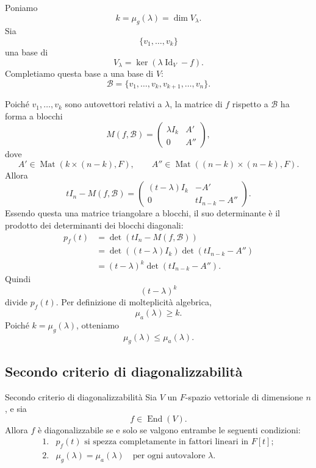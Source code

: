 \documentclass[a4paper]{article}
\begin{document}
\begin{snippetproof}{}
    Poniamo
    \[
        k=\mu_g(\lambda)=\dim V_\lambda.
    \]
    Sia
    \[
        \{v_1,\ldots,v_k\}
    \]
    una base di
    \[
        V_\lambda=\ker(\lambda\operatorname{Id}_V-f).
    \]
    Completiamo questa base a una base di \(V\):
    \[
        \mathcal{B}
        =
        \{v_1,\ldots,v_k,v_{k+1},\ldots,v_n\}.
    \]

    Poiché \(v_1,\ldots,v_k\) sono autovettori relativi a \(\lambda\), la matrice di \(f\) rispetto a \(\mathcal{B}\) ha forma a blocchi
    \[
        M(f,\mathcal{B})
        =
        \begin{pmatrix}
            \lambda I_k & A'\\
            0 & A''
        \end{pmatrix},
    \]
    dove
    \[
        A'\in\operatorname{Mat}(k\times(n-k),F),
        \qquad
        A''\in\operatorname{Mat}((n-k)\times(n-k),F).
    \]
    Allora
    \[
        tI_n-M(f,\mathcal{B})
        =
        \begin{pmatrix}
            (t-\lambda)I_k & -A'\\
            0 & tI_{n-k}-A''
        \end{pmatrix}.
    \]
    Essendo questa una matrice triangolare a blocchi, il suo determinante è il prodotto dei determinanti dei blocchi diagonali:
    \begin{align*}
        p_f(t)
        &=
        \det(tI_n-M(f,\mathcal{B}))\\
        &=
        \det((t-\lambda)I_k)\det(tI_{n-k}-A'')\\
        &=
        (t-\lambda)^k\det(tI_{n-k}-A'').
    \end{align*}
    Quindi
    \[
        (t-\lambda)^k
    \]
    divide \(p_f(t)\). Per definizione di molteplicità algebrica,
    \[
        \mu_a(\lambda)\geq k.
    \]
    Poiché \(k=\mu_g(\lambda)\), otteniamo
    \[
        \mu_g(\lambda)\leq\mu_a(\lambda).
    \]
\end{snippetproof}

\subsection{Secondo criterio di diagonalizzabilità}

\begin{snippettheorem}{Secondo criterio di diagonalizzabilità}
    Sia \(V\) un \(F\)-spazio vettoriale di dimensione \(n\), e sia
    \[
        f\in\operatorname{End}(V).
    \]
    Allora \(f\) è diagonalizzabile se e solo se valgono entrambe le seguenti condizioni:
    \[
        \begin{array}{ll}
            \text{1.} & p_f(t) \text{ si spezza completamente in fattori lineari in } F[t];\\[1mm]
            \text{2.} & \mu_g(\lambda)=\mu_a(\lambda)
            \quad
            \text{per ogni autovalore } \lambda.
        \end{array}
    \]
\end{snippettheorem}
\end{document}
